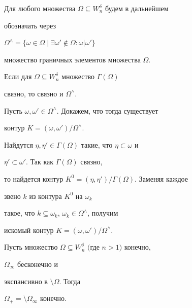  


Для любого множества $\Omega\subseteq W^\delta_n$ будем в дальнейшем 


обозначать через 


$\Omega^\wedge=\{\omega\in\Omega\mid\exists\omega'\notin\Omega: 


\omega|\omega'\}$ 


множество граничных элементов множества $\Omega$. 


 


\begin{lem} 


Если для $\Omega\subseteq W^\delta_n$ множество $\Gamma(\Omega)$ 


связно, то связно и $\Omega^\wedge$. 


\end{lem} 


 


\begin{pf} 


Пусть $\omega,\omega'\in\Omega^\wedge$. Докажем, что тогда существует 


контур $K=(\omega,\omega')/\Omega^\wedge$. 


Найдутся $\eta,\eta'\in\Gamma(\Omega)$ такие, что $\eta\subset\omega$ и 


$\eta'\subset\omega'$. Так как $\Gamma(\Omega)$ связно, 


то найдется контур $K^0=(\eta,\eta')/\Gamma(\Omega)$. Заменяя каждое 


звено $k$ из контура $K^0$ на $\omega_k$ 


такое, что $k\subseteq\omega_k$, $\omega_k\in\Omega^\wedge$, получим 


искомый контур $K=(\omega,\omega')/\Omega^\wedge$. 


\end{pf} 


 


\begin{lem} 


Пусть множество $\Omega\subseteq W^\delta_n$ $($где $n>1)$ конечно, 


$\Omega_\infty$ бесконечно и 


экспансивно в $\setminus\Omega$. Тогда 


$\Omega_+=\setminus\Omega_\infty$ конечно. 


\end{lem} 


